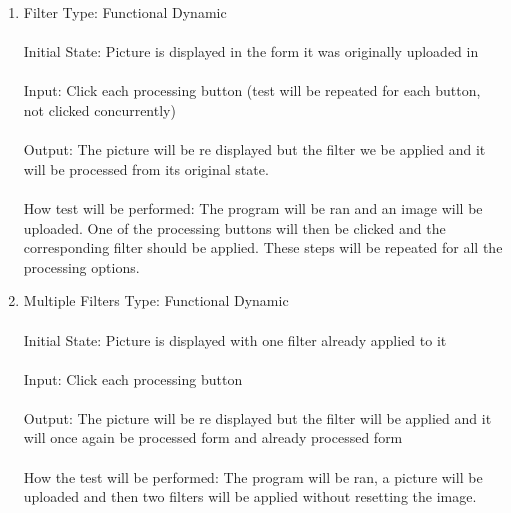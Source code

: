\documentclass[12pt, titlepage]{article}
\begin{document}
\begin{enumerate}

\item{Filter}
Type: Functional Dynamic\\ \\
Initial State: Picture is displayed in the form it was originally uploaded in\\ \\
Input: Click each processing button (test will be repeated for each button, not clicked concurrently)\\ \\
Output: The picture will be re displayed but the filter we be applied and it will be processed from its original state. \\ \\
How test will be performed: The program will be ran and an image will be uploaded. One of the processing buttons will then be clicked and the corresponding filter should be applied. These steps will be repeated for all the processing options.

\item{Multiple Filters}
Type: Functional Dynamic\\ \\
Initial State: Picture is displayed with one filter already applied to it\\ \\
Input: Click each processing button\\ \\
Output: The picture will be re displayed but the filter will be applied and it will once again be processed form and already processed form \\ \\
How the test will be performed: The program will be ran, a picture will be uploaded and then two filters will be applied without resetting the image.


\end{enumerate}
\end{document}
